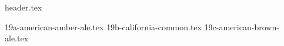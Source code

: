 \clearpage
{}
\divisorLine

{header.tex}

\begin{multicols}{2}

{19a-american-amber-ale.tex}
{19b-california-common.tex}
{19c-american-brown-ale.tex}

\end{multicols}